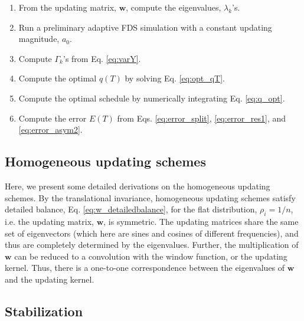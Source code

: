 \documentclass[reprint, superscriptaddress, floatfix]{revtex4-1}
\newcommand{\Err}{E}
\begin{document}
\begin{enumerate}

\item
From the updating matrix, $\mathbf w$,
compute the eigenvalues, $\lambda_k$'s.

\item
Run a preliminary adaptive FDS simulation
with a constant updating magnitude, $a_0$.

\item
Compute $\Gamma_k$'s from Eq. \eqref{eq:varY}.

\item
Compute the optimal $q(T)$ by solving Eq. \eqref{eq:opt_qT}.

\item
Compute the optimal schedule by
numerically integrating Eq. \eqref{eq:q_opt}.

\item
  Compute the error $\Err(T)$ from
Eqs. \eqref{eq:error_split},
  \eqref{eq:error_res1},
  and
  \eqref{eq:error_asym2}.

\end{enumerate}





\subsection{\label{sec:more_wband}
Homogeneous updating schemes
}


Here, we present some detailed derivations
on the homogeneous updating schemes.
%
By the translational invariance,
homogeneous updating schemes
satisfy detailed balance,
Eq. \eqref{eq:w_detailedbalance},
for the flat distribution, $\rho_i = 1/n$,
i.e. the updating matrix, $\mathbf w$,
is symmetric.
%
The updating matrices
share the same set of eigenvectors
(which here are sines and cosines of different frequencies),
and thus are completely determined
by the eigenvalues.
%
Further, the multiplication of $\mathbf w$
can be reduced to a convolution with the window function,
or the updating kernel.
%
Thus,
there is a one-to-one correspondence between
the eigenvalues of $\mathbf w$
and the updating kernel.




\subsection{\label{sec:stabilize_wband}
Stabilization}
\end{document}
